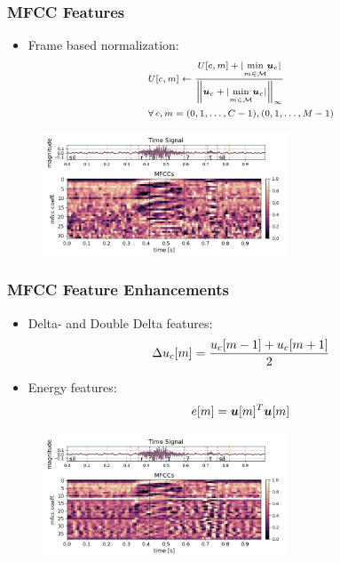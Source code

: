 \begin{frame}
  \frametitle{MFCC Features}
  \vspace{-1cm}
  \begin{itemize}
    \item Frame based normalization:
    \begin{equation*}
      \scriptsize
      \begin{aligned}
        &U[c, m] \gets \frac{U[c, m] + \vert \underset{m \in \mathcal{M}}{\min} \bm{u}_c \vert}{\norm{\bm{u}_c + \vert \underset{m \in \mathcal{M}}{\min} \bm{u}_c \vert}_\infty}\\
        & \forall \, c, m = (0, 1, \dots, C - 1), (0, 1, \dots, M - 1)
      \end{aligned}
    \end{equation*}
  \end{itemize}
  \vspace{-0.25cm}
  \begin{figure} \includegraphics[width=0.65\textwidth]{../3_signal/figs/signal_mfcc_showcase_mfcc32_right0.png} \end{figure}
\end{frame}

\begin{frame}
  \frametitle{MFCC Feature Enhancements}
  \vspace{-1cm}
  \begin{itemize}
    \item Delta- and Double Delta features:
    \begin{equation*}
      \scriptsize
      \Delta u_c[m] = \frac{u_c[m - 1] + u_c[m + 1]}{2}
    \end{equation*}
    \item Energy features:
    \begin{equation*}
      \scriptsize
      e[m] = \bm{u}[m]^T \bm{u}[m]
    \end{equation*}
  \end{itemize}
  \begin{figure} \includegraphics[width=0.65\textwidth]{../3_signal/figs/signal_mfcc_showcase_mfcc39_right0.png} \end{figure}
\end{frame}

